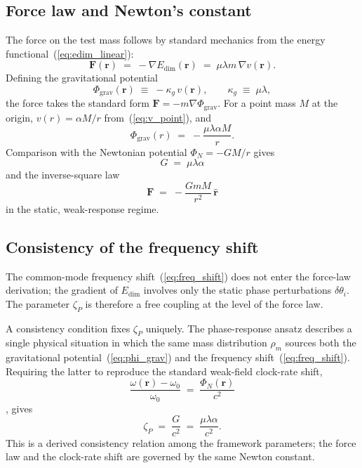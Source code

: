 \documentclass[a4paper,fleqn]{cas-dc}
\theoremstyle{thmstyleone}%
\theoremstyle{thmstyletwo}%
\begin{document}
\subsection{Force law and Newton's constant}

The force on the test mass follows by standard mechanics from
the energy functional~(\ref{eq:edim_linear}):
\begin{equation}
    \mathbf{F}(\mathbf{r})
    \;=\;
    -\nabla E_{\mathrm{dim}}(\mathbf{r})
    \;=\;
    \mu\lambda m\,\nabla v(\mathbf{r}).
    \label{eq:force_general}
\end{equation}
Defining the gravitational potential
\begin{equation}
    \Phi_{\mathrm{grav}}(\mathbf{r})
    \;\equiv\;
    -\kappa_g\,v(\mathbf{r}),
    \qquad
    \kappa_g \;\equiv\; \mu\lambda,
    \label{eq:phi_grav}
\end{equation}
the force takes the standard form
$\mathbf{F}=-m\nabla\Phi_{\mathrm{grav}}$. For a point mass
$M$ at the origin, $v(r)=\alpha M/r$
from~(\ref{eq:v_point}), and
\begin{equation}
    \Phi_{\mathrm{grav}}(r)
    \;=\;
    -\frac{\mu\lambda\alpha M}{r}.
\end{equation}
Comparison with the Newtonian potential $\Phi_N=-GM/r$ gives
\begin{equation}
\boxed{\;
    G \;=\; \mu\lambda\alpha\;}
    \label{eq:G_identification}
\end{equation}
and the inverse-square law
\begin{equation}
    \mathbf{F}
    \;=\;
    -\frac{GmM}{r^2}\,\hat{\mathbf{r}}
\end{equation}
in the static, weak-response regime.

\subsection{Consistency of the frequency shift}

The common-mode frequency shift~(\ref{eq:freq_shift}) does not
enter the force-law derivation; the gradient of
$E_{\mathrm{dim}}$ involves only the static phase perturbations
$\delta\theta_i$. The parameter $\zeta_P$ is therefore a free
coupling at the level of the force law.

A consistency condition fixes $\zeta_P$ uniquely. The
phase-response ansatz describes a single physical situation in
which the same mass distribution $\rho_m$ sources both the
gravitational potential~(\ref{eq:phi_grav}) and the frequency
shift~(\ref{eq:freq_shift}). Requiring the latter to reproduce
the standard weak-field clock-rate shift,
\begin{equation}
    \frac{\omega(\mathbf{r})-\omega_0}{\omega_0}
    \;=\;
    \frac{\Phi_N(\mathbf{r})}{c^2}
\end{equation}
\cite{MTW1973,Chou2010,Bothwell2022}, gives
\begin{equation}
\boxed{\;
    \zeta_P\;=\;\frac{G}{c^2}\;=\;\frac{\mu\lambda\alpha}{c^2}.
\;}
    \label{eq:zeta_consistency}
\end{equation}
This is a derived consistency relation among the framework
parameters; the force law and the clock-rate shift are governed
by the same Newton constant.
\end{document}
